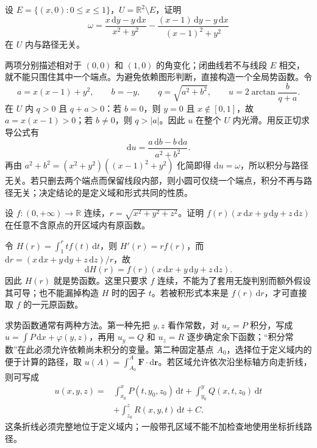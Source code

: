 \documentclass[UTF8,12pt,a4paper,fontset=fandol]{ctexbook}
\begin{document}
\begin{example}
\label{ex:path-independent-difference-angular-forms}
设 $E=\{(x,0):0\leq x\leq1\}$，$U=\mathbb R^2\setminus E$，证明
\[
    \omega=\frac{x\,\mathrm dy-y\,\mathrm dx}{x^2+y^2}
     -\frac{(x-1)\,\mathrm dy-y\,\mathrm dx}{(x-1)^2+y^2}
\]
在 $U$ 内与路径无关。
\end{example}
\begin{solve}
两项分别描述相对于 $(0,0)$ 和 $(1,0)$ 的角变化；闭曲线若不与线段 $E$ 相交，就不能只围住其中一个端点。为避免依赖图形判断，直接构造一个全局势函数。令
\[
    a=x(x-1)+y^2,\qquad b=-y,\qquad q=\sqrt{a^2+b^2},
    \qquad u=2\arctan\frac b{q+a}.
\]
在 $U$ 内 $q>0$ 且 $q+a>0$：若 $b=0$，则 $y=0$ 且 $x\notin[0,1]$，故 $a=x(x-1)>0$；若 $b\neq0$，则 $q>|a|$。因此 $u$ 在整个 $U$ 内光滑。用反正切求导公式有
\[
    \mathrm du=\frac{a\,\mathrm db-b\,\mathrm da}{a^2+b^2}.
\]
再由 $a^2+b^2=(x^2+y^2)((x-1)^2+y^2)$ 化简即得 $\mathrm du=\omega$，所以积分与路径无关。若只删去两个端点而保留线段内部，则小圆可仅绕一个端点，积分不再与路径无关；决定结论的是定义域和形式共同的性质。
\end{solve}

\begin{example}
\label{ex:path-independent-radial-field}
设 $f:(0,+\infty)\to\mathbb R$ 连续，$r=\sqrt{x^2+y^2+z^2}$。证明 $f(r)(x\,\mathrm dx+y\,\mathrm dy+z\,\mathrm dz)$ 在任意不含原点的开区域内有原函数。
\end{example}
\begin{solve}
令 $H(r)=\int_1^r t f(t)\,\mathrm dt$，则 $H'(r)=rf(r)$，而 $\mathrm dr=(x\,\mathrm dx+y\,\mathrm dy+z\,\mathrm dz)/r$，故
\[
    \mathrm dH(r)=f(r)(x\,\mathrm dx+y\,\mathrm dy+z\,\mathrm dz).
\]
因此 $H(r)$ 就是势函数。这里只要求 $f$ 连续，不能为了套用无旋判别而额外假设其可导；也不能漏掉构造 $H$ 时的因子 $t$。若被积形式本来是 $f(r)\,\mathrm dr$，才可直接取 $f$ 的一元原函数。
\end{solve}

求势函数通常有两种方法。第一种先把 $y,z$ 看作常数，对 $u_x=P$ 积分，写成 $u=\int P\,\mathrm dx+\varphi(y,z)$，再用 $u_y=Q$ 和 $u_z=R$ 逐步确定余下函数；“积分常数”在此必须允许依赖尚未积分的变量。第二种固定基点 $A_0$，选择位于定义域内的便于计算的路径，取 $u(A)=\int_{A_0}^A\boldsymbol F\cdot\mathrm d\boldsymbol r$。若区域允许依次沿坐标轴方向走折线，则可写成
\begin{align*}
    u(x,y,z)={}&\int_{x_0}^xP(t,y_0,z_0)\,\mathrm dt
    +\int_{y_0}^yQ(x,t,z_0)\,\mathrm dt\\
    &+\int_{z_0}^zR(x,y,t)\,\mathrm dt+C.
\end{align*}
这条折线必须完整地位于定义域内；一般带孔区域不能不加检查地使用坐标折线路径。
\end{document}
